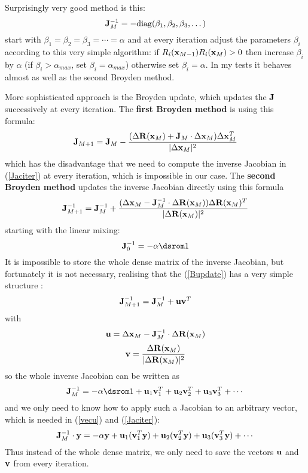 Surprisingly very good method is this: 
\begin{equation*}
  {\bf J}_M^{-1}=-{\rm diag}(\beta_1,\beta_2,\beta_3,\dots)
\end{equation*}
start with $\beta_1=\beta_2=\beta_3=\cdots=\alpha$ and at every iteration adjust the parameters $\beta_i$ according to this very simple algorithm: if $R_i({\bf x}_{M-1})R_i({\bf x}_M)>0$ then increase $\beta_i$ by $\alpha$ (if $\beta_i>\alpha_{max}$, set $\beta_i=\alpha_{max}$) otherwise set $\beta_i=\alpha$. In my tests it behaves almost as well as the second Broyden method.

More sophisticated approach is the Broyden update, which updates the ${\bf J}$ successively at every iteration. The \textbf{first Broyden method} is using this formula: 
\begin{equation*}
  {\bf J}_{M+1}={\bf J}_M-{(\Delta{\bf R}({\bf x}_M)+{\bf J}_M\cdot\Delta{\bf x}_M)\Delta{\bf x}_M^T\over |\Delta{\bf x}_M|^2}
\end{equation*}
which has the disadvantage that we need to compute the inverse Jacobian in (\ref{Jaciter}) at every iteration, which is impossible in our case. The \textbf{second Broyden method} updates the inverse Jacobian directly using this formula 
\begin{equation}
  {\bf J}_{M+1}^{-1}={\bf J}_M^{-1}+{(\Delta{\bf x}_M-{\bf J}_M^{-1}\cdot\Delta{\bf R}({\bf x}_M)) \Delta{\bf R}({\bf x}_M)^T\over |\Delta{\bf R}({\bf x}_M)|^2}  \label{Bupdate}
\end{equation}
starting with the linear mixing: 
\begin{equation*}
  \J_0^{-1}=-\alpha\one
\end{equation*}
It is impossible to store the whole dense matrix of the inverse Jacobian, but fortunately it is not necessary, realising that the (\ref{Bupdate}) has a very simple structure \cite{srivastava}: 
\begin{equation*}
  {\bf J}_{M+1}^{-1}={\bf J}_M^{-1}+{\bf u}{\bf v}^T
\end{equation*}
with 
\begin{equation}
  {\bf u}=\Delta{\bf x}_M-{\bf J}_M^{-1}\cdot\Delta{\bf R}({\bf x}_M)  \label{vecu}
\end{equation}
\begin{equation*}
  {\bf v}={\Delta{\bf R}({\bf x}_M)\over |\Delta{\bf R}({\bf x}_M)|^2}
\end{equation*}
so the whole inverse Jacobian can be written as 
\begin{equation*}
  \J_M^{-1}=-\alpha\one+{\bf u}_1{\bf v}_1^T+{\bf u}_2{\bf v}_2^T+ {\bf u}_3{\bf v}_3^T+\cdots
\end{equation*}
and we only need to know how to apply such a Jacobian to an arbitrary vector, which is needed in (\ref{vecu}) and (\ref{Jaciter}): 
\begin{equation*}
  {\bf J}_M^{-1}\cdot{\bf y}=-\alpha{\bf y}+{\bf u}_1({\bf v}_1^T{\bf y}) +{\bf u}_2({\bf v}_2^T{\bf y})+ {\bf u}_3({\bf v}_3^T{\bf y})+\cdots
\end{equation*}
Thus instead of the whole dense matrix, we only need to save the vectors ${\bf u}$ and ${\bf v}$ from every iteration.

